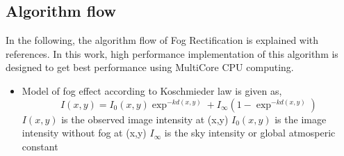 \subsection{Algorithm flow}
In the following, the algorithm flow of Fog Rectification is explained with references. In this work, high performance implementation of this algorithm is designed to get best performance using MultiCore CPU computing.
\begin{itemize}
\item Model of fog effect according to Koschmieder law \cite{fogRemoval} \cite{dehaze} \cite{fastvis} \cite{ChrFramework} is given as,
\begin{equation}\label{fog model}
I(x,y)=I_0(x,y)\exp^{-kd(x,y)} + I_\infty(1-\exp^{-kd(x,y)})
\end{equation}
$I(x,y)$ is the observed image intensity at (x,y)
$I_0(x,y)$ is the image intensity without fog at (x,y)
$I_\infty$ is the sky intensity or global atmosperic constant


\end{itemize}
